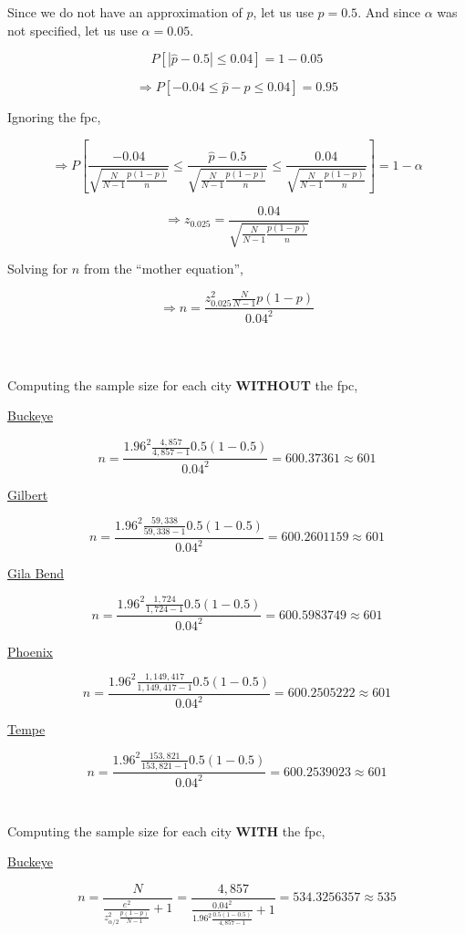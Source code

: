 \documentclass[12pt]{article}
\begin{document}
Since we do not have an approximation of \(p\), let us use \(p=0.5\).
And since \(\alpha\) was not specified, let us use \(\alpha=0.05\).

\[
P\left[|\hat p - 0.5| \leq 0.04\right] = 1-0.05
\]

\[
\Rightarrow P\left[-0.04 \leq \hat p - p \leq 0.04\right] = 0.95
\]

Ignoring the fpc,

\[
\Rightarrow P\left[\frac{-0.04}{\sqrt{\frac{N}{N-1}\frac{p(1-p)}{n}}} \leq \frac{\hat p - 0.5}{\sqrt{\frac{N}{N-1}\frac{p(1-p)}{n}}} \leq \frac{0.04}{\sqrt{\frac{N}{N-1}\frac{p(1-p)}{n}}}\right]=1-\alpha
\]

\[
\Rightarrow z_{0.025} = \frac{0.04}{\sqrt{\frac{N}{N-1}\frac{p(1-p)}{n}}}
\]

Solving for \(n\) from the ``mother equation'',

\[
\Rightarrow n = \frac{z_{0.025}^2\frac{N}{N-1}p(1-p)}{0.04^2}
\]
\\
\\
\\
Computing the sample size for each city \textbf{WITHOUT} the fpc,

\ul{Buckeye}

\[
n = \frac{1.96^2\frac{4,857}{4,857-1}0.5(1-0.5)}{0.04^2} = 600.37361 \approx \boxed{601}
\]

\ul{Gilbert}

\[
n = \frac{1.96^2\frac{59,338}{59,338-1}0.5(1-0.5)}{0.04^2} = 600.2601159 \approx \boxed{601} 
\]

\ul{Gila Bend}

\[
n = \frac{1.96^2\frac{1,724}{1,724-1}0.5(1-0.5)}{0.04^2} = 600.5983749 \approx \boxed{601} 
\]

\ul{Phoenix}

\[
n = \frac{1.96^2\frac{1,149,417}{1,149,417-1}0.5(1-0.5)}{0.04^2} = 600.2505222 \approx \boxed{601}
\]

\ul{Tempe}

\[
n = \frac{1.96^2\frac{153,821}{153,821-1}0.5(1-0.5)}{0.04^2} = 600.2539023 \approx \boxed{601}
\]
\\
\\
Computing the sample size for each city \textbf{WITH} the fpc,

\ul{Buckeye}

\[
n = \frac{N}{\frac{e^2}{{z_{\alpha/2}^2}\frac{p(1-p)}{N-1}} + 1} = \frac{4,857}{\frac{0.04^2}{{1.96^2}\frac{0.5(1-0.5)}{4,857-1}} + 1} = 534.3256357 \approx \boxed{535}
\]
\end{document}
